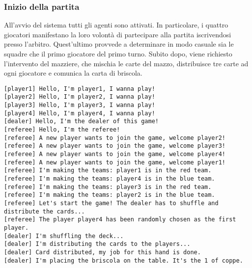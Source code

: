 \documentclass[a4paper,12pt]{article}
\begin{document}
\subsubsection{Inizio della partita}
All'avvio del sistema tutti gli agenti sono attivati. In particolare, i quattro giocatori manifestano la loro volontà di partecipare alla partita iscrivendosi presso l'arbitro. Quest'ultimo provvede a determinare in modo casuale sia le squadre che il primo giocatore del primo turno. Subito dopo, viene richiesto l'intervento del mazziere, che mischia le carte del mazzo, distribuisce tre carte ad ogni giocatore e comunica la carta di briscola.

\begin{Verbatim}
[player1] Hello, I'm player1, I wanna play!
[player2] Hello, I'm player2, I wanna play!
[player3] Hello, I'm player3, I wanna play!
[player4] Hello, I'm player4, I wanna play!
[dealer] Hello, I'm the dealer of this game!
[referee] Hello, I'm the referee!
[referee] A new player wants to join the game, welcome player2!
[referee] A new player wants to join the game, welcome player3!
[referee] A new player wants to join the game, welcome player4!
[referee] A new player wants to join the game, welcome player1!
[referee] I'm making the teams: player1 is in the red team.
[referee] I'm making the teams: player4 is in the blue team.
[referee] I'm making the teams: player3 is in the red team.
[referee] I'm making the teams: player2 is in the blue team.
[referee] Let's start the game! The dealer has to shuffle and distribute the cards...
[referee] The player player4 has been randomly chosen as the first player.
[dealer] I'm shuffling the deck...
[dealer] I'm distributing the cards to the players...
[dealer] Card distributed, my job for this hand is done.
[dealer] I'm placing the briscola on the table. It's the 1 of coppe.
\end{Verbatim}
\end{document}
